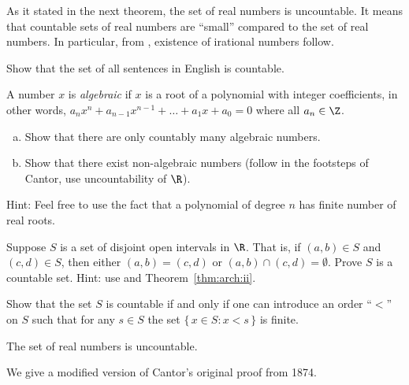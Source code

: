 \documentclass[12pt]{book}
\begin{document}
As it stated in the next theorem, 
the set of real numbers is uncountable.
It means that countable sets of real numbers are ``small'' compared to the set of real numbers. 
In particular, from , existence of irational numbers follow. 

\begin{exercise}\label{ex:sentences}
Show that the set of all sentences in English is countable.
\end{exercise}

\begin{exercise}[Challenging]
A number $x$ is \emph{algebraic} if $x$ is a root of a polynomial with
integer coefficients, in other words, $a_n x^n + a_{n-1} x^{n-1}  + \ldots
+ a_1 x + a_0 = 0$ where all $a_n \in \Z$. 
\begin{enumerate}[a)]
 \item Show that there are only countably many algebraic numbers.
 \item Show that there exist non-algebraic
numbers (follow in the footsteps of Cantor, use uncountability of $\R$).
\end{enumerate}
Hint: Feel free to use the fact that a polynomial of degree $n$ has finite number of real roots.
\end{exercise}

\begin{exercise}
Suppose $S$ is a set of disjoint open intervals in $\R$.
That is, 
if $(a,b) \in S$ and $(c,d) \in S$, then either $(a,b) = (c,d)$
or $(a,b) \cap (c,d) = \emptyset$.
Prove $S$ is a countable set. 
Hint: use  and Theorem~\ref{thm:arch:ii}.
\end{exercise}

\begin{exercise}
Show that the set $S$ is countable if and only if one can introduce an order ``$<$'' on $S$ such that for any $s\in S$ the set $\{\,x\in S: x<s\,\}$ is finite.
\end{exercise}

\begin{thm}[Cantor]\label{thm:Cantor}
The set of real numbers is uncountable.
\end{thm}

We give a modified version of
Cantor's original proof from
1874.  
\end{document}
